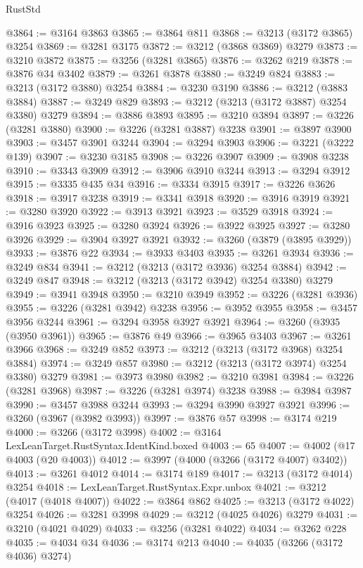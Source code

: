 \begin{lexlean}{RustStd}
\begin{coremodule}
{\begin{coremodule}
{{{{{{{{{{{{{{{{{{{{{{{{{{@3864 := @3164 @3863
@3865 := @3864 @811
@3868 := @3213 (@3172 @3865) @3254
@3869 := @3281 @3175
@3872 := @3212 (@3868 @3869) @3279
@3873 := @3210 @3872
@3875 := @3256 (@3281 @3865)
@3876 := @3262 @219
@3878 := @3876 @34 @3402
@3879 := @3261 @3878
@3880 := @3249 @824
@3883 := @3213 (@3172 @3880) @3254
@3884 := @3230 @3190
@3886 := @3212 (@3883 @3884)
@3887 := @3249 @829
@3893 := @3212 (@3213 (@3172 @3887) @3254 @3380) @3279
@3894 := @3886 @3893
@3895 := @3210 @3894
@3897 := @3226 (@3281 @3880)
@3900 := @3226 (@3281 @3887) @3238
@3901 := @3897 @3900
@3903 := @3457 @3901 @3244
@3904 := @3294 @3903
@3906 := @3221 (@3222 @139)
@3907 := @3230 @3185
@3908 := @3226 @3907
@3909 := @3908 @3238
@3910 := @3343 @3909
@3912 := @3906 @3910 @3244
@3913 := @3294 @3912
@3915 := @3335 @435 @34
@3916 := @3334 @3915
@3917 := @3226 @3626
@3918 := @3917 @3238
@3919 := @3341 @3918
@3920 := @3916 @3919
@3921 := @3280 @3920
@3922 := @3913 @3921
@3923 := @3529 @3918
@3924 := @3916 @3923
@3925 := @3280 @3924
@3926 := @3922 @3925
@3927 := @3280 @3926
@3929 := @3904 @3927 @3921
@3932 := @3260 (@3879 (@3895 @3929))
@3933 := @3876 @22
@3934 := @3933 @3403
@3935 := @3261 @3934
@3936 := @3249 @834
@3941 := @3212 (@3213 (@3172 @3936) @3254 @3884)
@3942 := @3249 @847
@3948 := @3212 (@3213 (@3172 @3942) @3254 @3380) @3279
@3949 := @3941 @3948
@3950 := @3210 @3949
@3952 := @3226 (@3281 @3936)
@3955 := @3226 (@3281 @3942) @3238
@3956 := @3952 @3955
@3958 := @3457 @3956 @3244
@3961 := @3294 @3958 @3927 @3921
@3964 := @3260 (@3935 (@3950 @3961))
@3965 := @3876 @49
@3966 := @3965 @3403
@3967 := @3261 @3966
@3968 := @3249 @852
@3973 := @3212 (@3213 (@3172 @3968) @3254 @3884)
@3974 := @3249 @857
@3980 := @3212 (@3213 (@3172 @3974) @3254 @3380) @3279
@3981 := @3973 @3980
@3982 := @3210 @3981
@3984 := @3226 (@3281 @3968)
@3987 := @3226 (@3281 @3974) @3238
@3988 := @3984 @3987
@3990 := @3457 @3988 @3244
@3993 := @3294 @3990 @3927 @3921
@3996 := @3260 (@3967 (@3982 @3993))
@3997 := @3876 @57
@3998 := @3174 @219
@4000 := @3266 (@3172 @3998)
@4002 := @3164 LexLeanTarget.RustSyntax.IdentKind.boxed
@4003 := 65
@4007 := @4002 (@17 @4003 (@20 @4003))
@4012 := @3997 (@4000 (@3266 (@3172 @4007) @3402))
@4013 := @3261 @4012
@4014 := @3174 @189
@4017 := @3213 (@3172 @4014) @3254
@4018 := LexLeanTarget.RustSyntax.Expr.unbox
@4021 := @3212 (@4017 (@4018 @4007))
@4022 := @3864 @862
@4025 := @3213 (@3172 @4022) @3254
@4026 := @3281 @3998
@4029 := @3212 (@4025 @4026) @3279
@4031 := @3210 (@4021 @4029)
@4033 := @3256 (@3281 @4022)
@4034 := @3262 @228
@4035 := @4034 @34
@4036 := @3174 @213
@4040 := @4035 (@3266 (@3172 @4036) @3274)
}}}}}}}}}}}}}}}}}}}}}}}}}}
\end{coremodule}}
\end{coremodule}
\end{lexlean}
